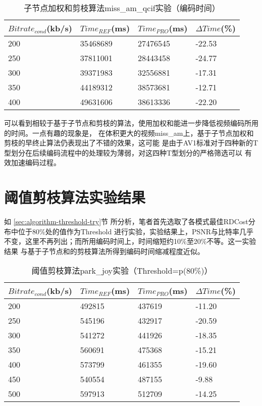 \begin{table}[H]
  \centering
    \caption{子节点加权和剪枝算法miss\_am\_qcif实验（编码时间）}
    \label{tab:result-weighted-miss-time}
    \begin{tabularx}{\linewidth}{XXXX}
      \toprule[1.5pt]
      $Bitrate_{cond}$(kb/s) & $Time_{REF}$(ms) & $Time_{PRO}$(ms) & $\Delta Time$(\%) \\
      \midrule[1pt]
      200 & 35468689 & 27476545 & -22.53 \\
      250 & 37811001 & 28443458 & -24.77 \\
      300 & 39371983 & 32556881 & -17.31 \\
      350 & 44189312 & 38573681 & -12.71\\
      400 & 49631606 & 38613336 & -22.20\\
      \bottomrule[1.5pt]
    \end{tabularx}
\end{table}


可以看到相较于基于子节点和剪枝的算法，使用加权和能进一步降低视频编码所用的时间。一点有趣的现象是，
在体积更大的视频miss\_am上，基于子节点加权和剪枝的早终止算法仍表现出了不错的效果，这可能
是由于AV1标准对于四种新的T型划分在后续编码流程中的处理较为薄弱，对这四种T型划分的严格筛选可以
有效加速编码过程。


\section{阈值剪枝算法实验结果}

如 \ref{sec:algorithm-threshold-try}节 所分析，笔者首先选取了各模式最佳RDCost分布中位于80\%处的值作为Threshold
进行实验，实验结果上，PSNR与比特率几乎不变，这里不再列出；而所用编码时间上，时间缩短约10\%至20\%不等。这一实验结果
与基于子节点和的剪枝算法所得到编码时间缩减程度近似。

\begin{table}[H]
  \centering
    \caption{阈值剪枝算法park\_joy实验（Threshold=p(80\%)）}
    \label{tab:result-threshold-park-time}
    \begin{tabularx}{\linewidth}{XXXX}
      \toprule[1.5pt]
      $Bitrate_{cond}$(kb/s) & $Time_{REF}$(ms) & $Time_{PRO}$(ms) & $\Delta Time$(\%) \\
      \midrule[1pt]
      200 & 492815 & 437619 & -11.20  \\
      250 & 545196 & 432917 & -20.59 \\
      300 & 541272 & 441926 & -18.35  \\
      350 & 560691 & 475368 & -15.21 \\
      400 & 573799 & 461355 & -19.60  \\
      450 & 540554 & 487155 & -9.88 \\
      500 & 597913 & 512709 & -14.25  \\
      \bottomrule[1.5pt]
    \end{tabularx}
\end{table}

